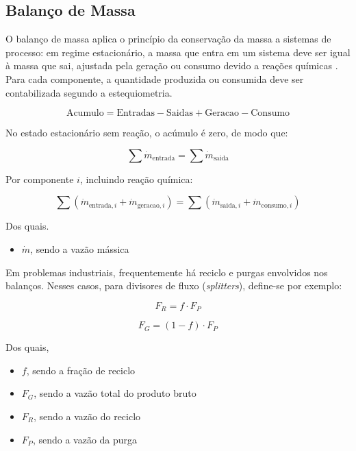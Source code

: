 \subsection{Balanço de Massa}

O balanço de massa aplica o princípio da conservação da massa a sistemas de processo: em regime estacionário, a massa que entra em um sistema deve ser igual à massa que sai, ajustada pela geração ou consumo devido a reações químicas \cite{felder2005}. Para cada componente, a quantidade produzida ou consumida deve ser contabilizada segundo a estequiometria.

\begin{equation}
\text{Acumulo} = \text{Entradas} - \text{Saidas} + \text{Geracao} - \text{Consumo}
\label{eq:mass_balance_word}
\end{equation}

No estado estacionário sem reação, o acúmulo é zero, de modo que:

\begin{equation}
\sum \dot{m}_{\mathrm{entrada}} = \sum \dot{m}_{\mathrm{saida}}
\label{eq:steady_state_mass_balance}
\end{equation}

Por componente $i$, incluindo reação química:

\begin{equation}
\sum \left(\dot{m}_{\mathrm{entrada},i} + \dot{m}_{\mathrm{geracao},i}\right) = \sum \left(\dot{m}_{\mathrm{saida},i} + \dot{m}_{\mathrm{consumo},i}\right)
\label{eq:component_mass_balance_rxn}
\end{equation}

Dos quais.
\begin{itemize}
    \item $\dot{m}$, sendo a vazão mássica
\end{itemize}

Em problemas industriais, frequentemente há reciclo e purgas envolvidos nos balanços. Nesses casos, para divisores de fluxo (\textit{splitters}), define-se por exemplo:

\begin{equation}
F_{R} = f \cdot F_{P}
\label{eq:recycle_flow}
\end{equation}

\begin{equation}
F_{G} = ( 1 - f ) \cdot F_{P}
\label{eq:gross_product_flow}
\end{equation}

Dos quais,
\begin{itemize}
    \item $f$, sendo a fração de reciclo
    \item $F_{G}$, sendo a vazão total do produto bruto
    \item $F_{R}$, sendo a vazão do reciclo
    \item $F_{P}$, sendo a vazão da purga
\end{itemize}

